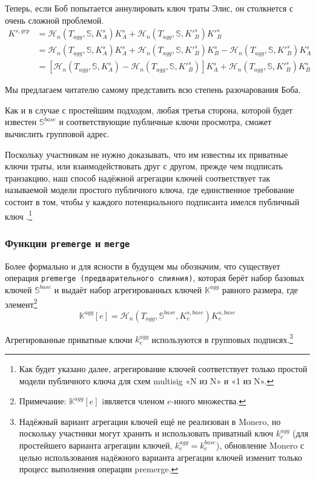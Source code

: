 Теперь, если Боб попытается аннулировать ключ траты Элис, он столкнется с очень сложной проблемой.\vspace{.175cm}
\begin{align*}
    K^{s,grp} &= \mathcal{H}_n(T_{agg},\mathbb{S},K^{s}_A)K^{s}_A + \mathcal{H}_n(T_{agg},\mathbb{S},K'^{s}_B)K'^{s}_B \\
             &= \mathcal{H}_n(T_{agg},\mathbb{S},K^{s}_A)K^{s}_A + \mathcal{H}_n(T_{agg},\mathbb{S},K'^{s}_B)K^{s}_B - \mathcal{H}_n(T_{agg},\mathbb{S},K'^{s}_B)K^{s}_A \\
             &= [\mathcal{H}_n(T_{agg},\mathbb{S},K^{s}_A) - \mathcal{H}_n(T_{agg},\mathbb{S},K'^{s}_B)]K^{s}_A + \mathcal{H}_n(T_{agg},\mathbb{S},K'^{s}_B)K^{s}_B
\end{align*}

Мы предлагаем читателю самому представить всю степень разочарования Боба.

Как и в случае с простейшим подходом, любая третья сторона, которой будет известен $\mathbb{S}^{base}$ и соответствующие публичные ключи просмотра, сможет вычислить групповой адрес.

Поскольку участникам не нужно доказывать, что им известны их приватные ключи траты, или взаимодействовать друг с другом, прежде чем подписать транзакцию, наш способ надёж\-ной агрегации ключей соответствует так называемой модели простого публичного ключа, где единственное требование состоит в том, чтобы у каждого потенциального подписанта имелся публичный ключ \cite{maxwell2018simple-musig}.\footnote{Как будет указано далее, агрегирование ключей соответствует только простой модели публичного ключа для схем multisig «N из N» и «1 из N».}

\subsubsection*{Функции {\tt premerge} и {\tt merge}}

Более формально и для ясности в будущем мы обозначим, что существует операция {\tt premerge (предварительного слияния)}, которая берёт набор базовых ключей $\mathbb{S}^{base}$ и выдаёт набор агрегированных ключей $\mathbb{K}^{agg}$ равного размера, где элемент\footnote{Примечание: $\mathbb{K}^{agg}[e]$ iявляется членом $e$-нного множества.}
\[\mathbb{K}^{agg}[e] = \mathcal{H}_n(T_{agg},\mathbb{S}^{base},K^{s,base}_e)K^{s,base}_e\]

Агрегированные приватные ключи $k^{agg}_e$ используются в групповых подписях.\footnote{Надёжный вариант агрегации ключей ещё не реализован в Monero, но поскольку участники могут хранить и использовать приватный ключ $k^{agg}_e$ (для простейшего варианта агрегации ключей, $k^{agg}_e = k^{base}_e$), обновление Monero с целью использования надёжного варианта агрегации ключей изменит только процесс выполнения операции premerge.}

